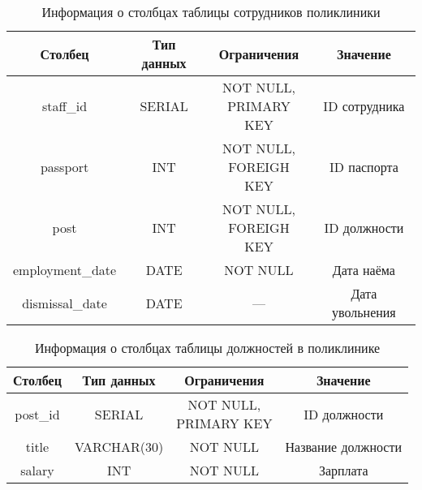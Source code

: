 \begin{table}[H]
\begin{center}
	\captionsetup{justification=raggedright,singlelinecheck=off,margin=5mm}
	\caption{Информация о столбцах таблицы сотрудников поликлиники}
	\begin{tabular}{| c | c | c | c |}
		\hline
		Столбец & Тип данных & Ограничения & Значение \\
		\hline
		staff\_id & SERIAL & \makecell{NOT NULL, \\ PRIMARY KEY} & ID сотрудника \\
		\hline
		passport & INT & \makecell{NOT NULL, \\ FOREIGH KEY} & ID паспорта \\
		\hline
		post & INT &  \makecell{NOT NULL, \\ FOREIGH KEY} & ID должности \\
		\hline
		employment\_date & DATE & NOT NULL& Дата наёма \\
		\hline
		dismissal\_date & DATE & --- & Дата увольнения\\
		\hline
	\end{tabular}
	\label{table:staff-columns}
\end{center}
\end{table}

\begin{table}[H]
\begin{center}
	\captionsetup{justification=raggedright,singlelinecheck=off,margin=5mm}
	\caption{Информация о столбцах таблицы должностей в поликлинике}
	\begin{tabular}{| c | c | c | c |}
		\hline
		Столбец & Тип данных & Ограничения & Значение \\
		\hline
		post\_id & SERIAL & \makecell{NOT NULL, \\ PRIMARY KEY} & ID должности \\
		\hline
		title & VARCHAR(30) & NOT NULL & Название должности \\
		\hline
		salary & INT & NOT NULL & Зарплата \\
		\hline
	\end{tabular}
	\label{table:posts-columns}
\end{center}
\end{table}

